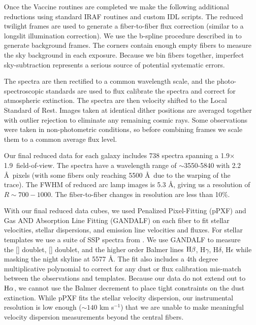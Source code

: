 \documentclass{emulateapj}
\newcommand\kms{km s$^{-1}$}
\newcommand\ha{$\rm{H}\alpha$}
\newcommand\hb{$\rm{H}\beta$}
\begin{document}
Once the Vaccine routines are completed we make the following additional reductions using standard IRAF routines and custom IDL scripts.  The reduced twilight frames are used to generate a fiber-to-fiber flux correction (similar to a longslit illumination correction).  We use the b-spline procedure described in \citet{Kelson03} to generate background frames.  The corners contain enough empty fibers to measure the sky background in each exposure.  Because we bin fibers together, imperfect sky-subtraction represents a serious source of potential systematic errors.  

The spectra are then rectified to a common wavelength scale, and the photo-spectroscopic standards are used to flux calibrate the spectra and correct for atmospheric extinction.  The spectra are then velocity shifted to the Local Standard of Rest.  Images taken at identical dither positions are averaged together with outlier rejection to eliminate any remaining cosmic rays.  Some observations were taken in non-photometric conditions, so before combining frames we scale them to a common average flux level.  

Our final reduced data for each galaxy includes 738 spectra spanning a 1.9\arcmin$\times$1.9\arcmin\ field-of-view.  The spectra have a wavelength range of $\sim$3550-5840 with 2.2 \AA\ pixels (with some fibers only reaching 5500 \AA\ due to the warping of the trace).  The FWHM of reduced arc lamp images is 5.3 \AA, giving us a resolution of $R\sim700-1000$.  The fiber-to-fiber changes in resolution are less than 10\%.  

With our final reduced data cubes, we used Penalized Pixel-Fitting (pPXF) \citep{Cappellari04} and Gas AND Absorption Line Fitting (GANDALF) \citep{Sarzi06} on each fiber to fit stellar velocities, stellar dispersions, and emission line velocities and fluxes.  For stellar templates we use a suite of SSP spectra from \citet{Bruzual03}.  We use GANDALF to measure the [] doublet, [] doublet, and the higher order Balmer lines \hb, H$\gamma$, H$\delta$, H$\epsilon$ while masking the night skyline at 5577 \AA.  The fit also includes a 4th degree multiplicative polynomial to correct for any dust or flux calibration mis-match between the observations and templates.  Because our data do not extend out to \ha, we cannot use the Balmer decrement to place tight constraints on the dust extinction.  While pPXF fits the stellar velocity dispersion, our instrumental resolution is low enough ($\sim140$ \kms) that we are unable to make meaningful velocity dispersion measurements beyond the central fibers.  
\end{document}

